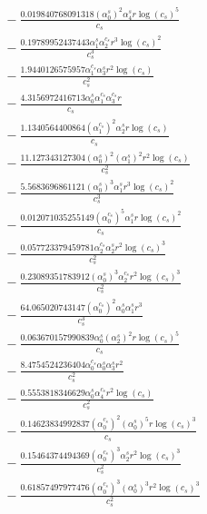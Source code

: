 \documentclass[10pt]{article}
\begin{document}
\begin{align*}
&{}  - \frac{0.019840768091318 \left(\alpha_{0}^s\right)^{2} \alpha_{4}^s r \log{\left(c_{s} \right)}^{5}}{c_{s}} \\
&{}  - \frac{0.19789952437443 \alpha_{1}^s \alpha_{2}^{c_s} r^{3} \log{\left(c_{s} \right)}^{2}}{c_{s}^{3}} \\
&{}  - \frac{1.9440126575957 \alpha_{1}^{c_s} \alpha_{3}^s r^{2} \log{\left(c_{s} \right)}}{c_{s}^{2}} \\
&{}  - \frac{4.3156972416713 \alpha_{0}^s \alpha_{1}^{c_s} \alpha_{3}^{c_s} r}{c_{s}} \\
&{}  - \frac{1.1340564400864 \left(\alpha_{1}^{c_s}\right)^{2} \alpha_{2}^s r \log{\left(c_{s} \right)}}{c_{s}} \\
&{}  - \frac{11.127343127304 \left(\alpha_{0}^s\right)^{2} \left(\alpha_{1}^s\right)^{2} r^{2} \log{\left(c_{s} \right)}}{c_{s}^{2}} \\
&{}  - \frac{5.5683696861121 \left(\alpha_{0}^s\right)^{3} \alpha_{1}^s r^{3} \log{\left(c_{s} \right)}^{2}}{c_{s}^{3}} \\
&{}  - \frac{0.012071035255149 \left(\alpha_{0}^{c_s}\right)^{5} \alpha_{1}^s r \log{\left(c_{s} \right)}^{2}}{c_{s}} \\
&{}  - \frac{0.057723379459781 \alpha_{2}^{c_s} \alpha_{2}^s r^{2} \log{\left(c_{s} \right)}^{3}}{c_{s}^{2}} \\
&{}  - \frac{0.23089351783912 \left(\alpha_{0}^s\right)^{3} \alpha_{2}^{c_s} r^{2} \log{\left(c_{s} \right)}^{3}}{c_{s}^{2}} \\
&{}  - \frac{64.065020743147 \left(\alpha_{0}^{c_s}\right)^{2} \alpha_{0}^s \alpha_{1}^s r^{3}}{c_{s}^{3}} \\
&{}  - \frac{0.063670157990839 \alpha_{0}^s \left(\alpha_{2}^s\right)^{2} r \log{\left(c_{s} \right)}^{5}}{c_{s}} \\
&{}  - \frac{8.4754524236404 \alpha_{0}^{c_s} \alpha_{0}^s \alpha_{3}^s r^{2}}{c_{s}^{2}} \\
&{}  - \frac{0.5553818346629 \alpha_{0}^s \alpha_{4}^{c_s} r^{2} \log{\left(c_{s} \right)}}{c_{s}^{2}} \\
&{}  - \frac{0.14623834992837 \left(\alpha_{0}^{c_s}\right)^{2} \left(\alpha_{0}^s\right)^{5} r \log{\left(c_{s} \right)}^{3}}{c_{s}} \\
&{}  - \frac{0.15464374494369 \left(\alpha_{0}^{c_s}\right)^{3} \alpha_{2}^s r^{2} \log{\left(c_{s} \right)}^{3}}{c_{s}^{2}} \\
&{}  - \frac{0.61857497977476 \left(\alpha_{0}^{c_s}\right)^{3} \left(\alpha_{0}^s\right)^{3} r^{2} \log{\left(c_{s} \right)}^{3}}{c_{s}^{2}} \\

\end{align*}
\end{document}
